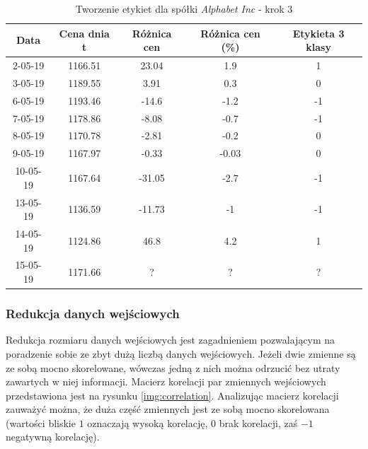 \documentclass[a4paper, twoside, 11pt, openright]{article}
\begin{document}
 \begin{table}[H]
    \centering
    \begin{tabular}{|c|c|c|c|c|}
    \hline
        \textbf{Data}  & \textbf{Cena dnia t} & \textbf{Różnica cen} & \textbf{Różnica cen (\%)}  & \textbf{Etykieta 3 klasy} \\ \hline
            2-05-19 & 1166.51 & 23.04 & 1.9 & 1 \\ \hline
            3-05-19 & 1189.55 & 3.91 & 0.3 & 0 \\ \hline
            6-05-19 & 1193.46 &  -14.6 & -1.2 & -1 \\ \hline
            7-05-19 & 1178.86 &  -8.08 & -0.7 & -1 \\ \hline
            8-05-19 & 1170.78 & -2.81 & -0.2 & 0 \\ \hline
            9-05-19 & 1167.97 &  -0.33 & -0.03 & 0 \\ \hline
            10-05-19 & 1167.64 &  -31.05 & -2.7 & -1 \\ \hline
            13-05-19 & 1136.59 &  -11.73 & -1 & -1 \\ \hline
            14-05-19 & 1124.86 &  46.8 & 4.2 & 1 \\ \hline 
            15-05-19 & 1171.66 & ? & ? & ? \\ \hline
    \end{tabular}
    \caption{Tworzenie etykiet dla spółki \textit{Alphabet Inc} - krok 3}
    \label{tab:classification_label_creation}
\end{table} 

\subsubsection{Redukcja danych wejściowych}

Redukcja rozmiaru danych wejściowych jest zagadnieniem pozwalającym na poradzenie sobie ze zbyt dużą liczbą danych wejściowych. Jeżeli dwie zmienne są ze sobą mocno skorelowane, wówczas jedną z nich można odrzucić bez utraty zawartych w niej informacji. Macierz korelacji par zmiennych wejściowych przedstawiona jest na rysunku \ref{img:correlation}. Analizując macierz korelacji zauważyć można, że duża część zmiennych jest ze sobą mocno skorelowana (wartości bliskie $1$ oznaczają wysoką korelację, 0 brak korelacji, zaś $-1$ negatywną korelację).
\end{document}
